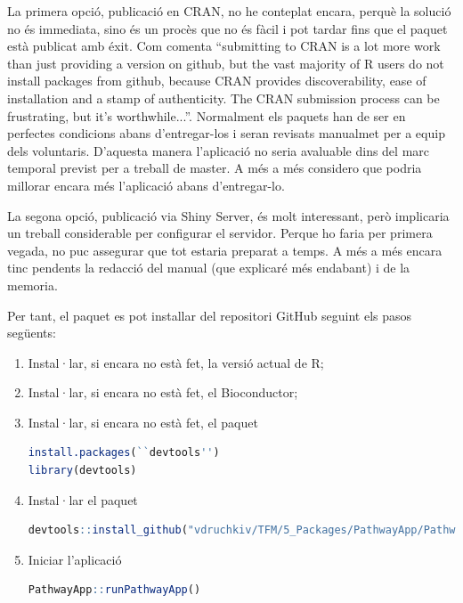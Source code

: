 \documentclass[]{article}
\begin{document}
La primera opció, publicació en CRAN, no he conteplat encara, perquè la solució no és immediata, sino és un procès que no és fàcil i pot tardar fins que el paquet està publicat amb éxit. Com comenta \cite{HWick} \enquote{submitting to CRAN is a lot more work than just providing a version on github, but the vast majority of R users do not install packages from github, because CRAN provides discoverability, ease of installation and a stamp of authenticity. The CRAN submission process can be frustrating, but it’s worthwhile...}. Normalment els paquets han de ser en perfectes condicions abans d'entregar-los i seran revisats  manualmet per a equip dels voluntaris.  D'aquesta manera l'aplicació no seria avaluable dins del marc temporal previst per a treball de master. A més a més considero que podria millorar encara més l'aplicació abans d'entregar-lo.

La segona opció, publicació via Shiny Server, és molt interessant, però implicaria un treball considerable per configurar el servidor. Perque ho faria per primera vegada, no puc assegurar que tot estaria preparat a temps. A més a més encara tinc pendents la redacció del manual (que explicaré més endabant) i de la memoria. 

Per tant, el paquet  es pot installar del repositori GitHub seguint els pasos següents:

\begin{enumerate}
\item Instal·lar, si encara no està fet, la versió actual de R;

\item Instal·lar, si encara no està fet, el Bioconductor;

\item Instal·lar, si encara no està fet, el paquet 

\begin{lstlisting}[language=R]
install.packages(``devtools'')
library(devtools)
\end{lstlisting}

\item Instal·lar el paquet 

\begin{lstlisting}[language=R]
devtools::install_github("vdruchkiv/TFM/5_Packages/PathwayApp/PathwayApp")
\end{lstlisting}

\item Iniciar l'aplicació 
\begin{lstlisting}[language=R]
PathwayApp::runPathwayApp()
\end{lstlisting}
\end{enumerate}
\end{document}

